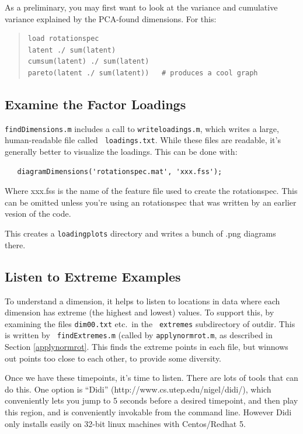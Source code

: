 \documentclass[11pt]{article}
\begin{document}
As a preliminary, you may first want to look at the variance and
cumulative variance explained by the PCA-found dimensions.  For this:

\begin{quote}
\begin{verbatim}
load rotationspec
latent ./ sum(latent) 
cumsum(latent) ./ sum(latent) 
pareto(latent ./ sum(latent))   # produces a cool graph
\end{verbatim}
\end{quote}


\subsection{Examine the Factor Loadings}

{\tt findDimensions.m} includes a call to {\tt writeloadings.m}, which
writes a large, human-readable file called {\tt
  loadings.txt}.  While these files are readable, it's generally better
to visualize the loadings.  This can be done with:

\begin{verbatim}
   diagramDimensions('rotationspec.mat', 'xxx.fss');
\end{verbatim}

Where xxx.fss is the name of the feature file used to create the
rotationspec.  This can be omitted unless you're using an rotationspec
that was written by an earlier vesion of the code.

This creates a {\tt loadingplots} directory and writes a bunch of
.png diagrams there. 

\subsection{Listen to Extreme Examples}

To understand a dimension, it helps to listen to locations in data
where each dimension has extreme (the highest and lowest) values.  To
support this, by examining the files {\tt dim00.txt} etc.\ in the {\tt
  extremes} subdirectory of outdir.  This is written by {\tt
  findExtremes.m} (called by {\tt applynormrot.m}, as described in
Section \ref{applynormrot}.  This finds the extreme points in each
file, but winnows out points too close to each other, to provide some
diversity.

Once we have these timepoints, it's time to listen.  There are lots of
tools that can do this.  One option is ``Didi''
(http://www.cs.utep.edu/nigel/didi/), which conveniently lets you jump
to 5 seconds before a desired timepoint, and then play this region, and
is conveniently invokable from the command line.  However Didi only
installs easily on 32-bit linux machines with Centos/Redhat 5.
\end{document}
